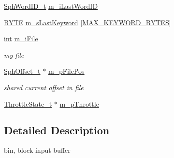 \begin{DoxyCompactItemize}
\hyperlink{sphinx_8h_a80a94d5984fdf9214a98f3e5e65df963}{Sph\-Word\-I\-D\-\_\-t} \hyperlink{structCSphBin_a24f8945a71004edb1208939b546a7673}{m\-\_\-i\-Last\-Word\-I\-D}
\item 
\hyperlink{sphinxstd_8h_a4ae1dab0fb4b072a66584546209e7d58}{B\-Y\-T\-E} \hyperlink{structCSphBin_ab3d45d1754daa2e7175ece1785856551}{m\-\_\-s\-Last\-Keyword} \mbox{[}\hyperlink{sphinx_8cpp_aeb328d19a9780d5c5defcd7e9b08239b}{M\-A\-X\-\_\-\-K\-E\-Y\-W\-O\-R\-D\-\_\-\-B\-Y\-T\-E\-S}\mbox{]}
\item 
\hyperlink{sphinxexpr_8cpp_a4a26e8f9cb8b736e0c4cbf4d16de985e}{int} \hyperlink{structCSphBin_a032b4e8ece9f3c7a457f5cf9ab1abc33}{m\-\_\-i\-File}
\begin{DoxyCompactList}\small\item\em my file \end{DoxyCompactList}\item 
\hyperlink{sphinx_8h_a0fb3b64afebef33c61367714754eaa90}{Sph\-Offset\-\_\-t} $\ast$ \hyperlink{structCSphBin_acfd4d417ade3bda7c77436723a9654ec}{m\-\_\-p\-File\-Pos}
\begin{DoxyCompactList}\small\item\em shared current offset in file \end{DoxyCompactList}\item 
\hyperlink{structThrottleState__t}{Throttle\-State\-\_\-t} $\ast$ \hyperlink{structCSphBin_ad11523bd78eae596117257d4556a1773}{m\-\_\-p\-Throttle}
\end{DoxyCompactItemize}


\subsection{Detailed Description}
bin, block input buffer 


